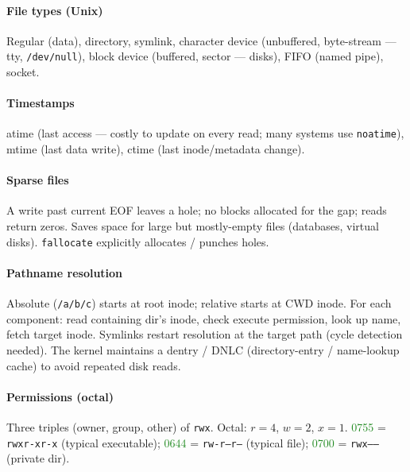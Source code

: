 \paragraph{File types (Unix)}
\textcolor{Bittersweet}{Regular} (data), \textcolor{Bittersweet}{directory}, \textcolor{Bittersweet}{symlink}, \textcolor{Bittersweet}{character device} (unbuffered, byte-stream — tty, \texttt{/dev/null}), \textcolor{Bittersweet}{block device} (buffered, sector — disks), \textcolor{Bittersweet}{FIFO} (named pipe), \textcolor{Bittersweet}{socket}.

\paragraph{Timestamps}
\textcolor{Bittersweet}{atime} (last access — costly to update on every read; many systems use \texttt{noatime}), \textcolor{Bittersweet}{mtime} (last data write), \textcolor{Bittersweet}{ctime} (last inode/metadata change).

\paragraph{Sparse files}
A write past current EOF leaves a \textcolor{Bittersweet}{hole}; no blocks allocated for the gap; reads return zeros. Saves space for large but mostly-empty files (databases, virtual disks). \texttt{fallocate} explicitly allocates / punches holes.

\paragraph{Pathname resolution}
Absolute (\texttt{/a/b/c}) starts at root inode; relative starts at CWD inode. For each component: read containing dir's inode, check execute permission, look up name, fetch target inode. Symlinks restart resolution at the target path (cycle detection needed). The kernel maintains a \textcolor{Bittersweet}{dentry / DNLC} (directory-entry / name-lookup cache) to avoid repeated disk reads.

\paragraph{Permissions (octal)}
Three triples (owner, group, other) of \texttt{rwx}. Octal: $r=4$, $w=2$, $x=1$.
\textcolor{ForestGreen}{0755} = \texttt{rwxr-xr-x} (typical executable); \textcolor{ForestGreen}{0644} = \texttt{rw-r--r--} (typical file); \textcolor{ForestGreen}{0700} = \texttt{rwx------} (private dir).

